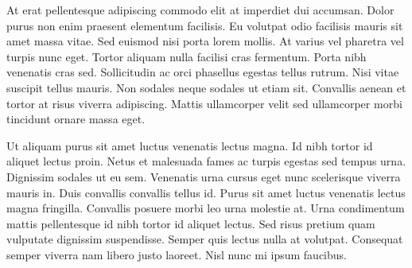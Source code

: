 At erat pellentesque adipiscing commodo elit at imperdiet dui accumsan. Dolor purus non enim praesent elementum facilisis. Eu volutpat odio facilisis mauris sit amet massa vitae. Sed euismod nisi porta lorem mollis. At varius vel pharetra vel turpis nunc eget. Tortor aliquam nulla facilisi cras fermentum. Porta nibh venenatis cras sed. Sollicitudin ac orci phasellus egestas tellus rutrum. Nisi vitae suscipit tellus mauris. Non sodales neque sodales ut etiam sit. Convallis aenean et tortor at risus viverra adipiscing. Mattis ullamcorper velit sed ullamcorper morbi tincidunt ornare massa eget.

Ut aliquam purus sit amet luctus venenatis lectus magna. Id nibh tortor id aliquet lectus proin. Netus et malesuada fames ac turpis egestas sed tempus urna. Dignissim sodales ut eu sem. Venenatis urna cursus eget nunc scelerisque viverra mauris in. Duis convallis convallis tellus id. Purus sit amet luctus venenatis lectus magna fringilla. Convallis posuere morbi leo urna molestie at. Urna condimentum mattis pellentesque id nibh tortor id aliquet lectus. Sed risus pretium quam vulputate dignissim suspendisse. Semper quis lectus nulla at volutpat. Consequat semper viverra nam libero justo laoreet. Nisl nunc mi ipsum faucibus.

\makeletterclosing

